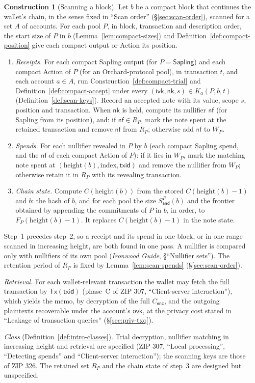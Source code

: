 \documentclass[11pt,a4paper]{article}
\theoremstyle{definition}
\newtheorem{construction}[theorem]{Construction}
\newcommand{\nfsym}{\mathsf{nf}}
\newcommand{\nksym}{\ensuremath{\mathsf{nk}}}
\newcommand{\ivk}{\ensuremath{\mathsf{ivk}}}
\newcommand{\ovk}{\ensuremath{\mathsf{ovk}}}
\begin{document}
\begin{construction}[Scanning a block]\label{def:scan-block}
Let $b$ be a compact block that continues the wallet's chain, in the sense
fixed in ``Scan order'' (\S\ref{sec:scan-order}), scanned for a set $A$ of
accounts. For each pool $P$, in block, transaction and description order,
the start size of $P$ in $b$ (Lemma~\ref{lem:compact-sizes}) and
Definition~\ref{def:compact-position} give each compact output or Action
its position.
\begin{enumerate}
\item \emph{Receipts.} For each compact Sapling output (for
  $P = \mathsf{Sapling}$) and each compact Action of $P$ (for an
  Orchard-protocol pool), in transaction $t$, and each account $a \in A$,
  run Construction~\ref{def:compact-trial} and
  Definition~\ref{def:compact-accept} under every $(\ivk, \nksym, s) \in
  K_a(P, b, t)$ (Definition~\ref{def:scan-keys}). Record an accepted note
  with its value, scope $s$, position and transaction. When $\nksym$ is
  held, compute its nullifier $\nfsym$ (for Sapling from its position), and:
  if $\nfsym \in R_P$, mark the note spent at the retained transaction and
  remove $\nfsym$ from $R_P$; otherwise add $\nfsym$ to $W_P$.
\item \emph{Spends.} For each nullifier revealed in $P$ by $b$ (each compact
  Sapling spend, and the $\nfsym$ of each compact Action of $P$): if it lies
  in $W_P$, mark the matching note spent at $(\mathrm{height}(b),
  \text{index}, \mathsf{txid})$ and remove the nullifier from $W_P$;
  otherwise retain it in $R_P$ with its revealing transaction.
\item \emph{Chain state.} Compute $C(\mathrm{height}(b))$ from the stored
  $C(\mathrm{height}(b) - 1)$ and $b$: the hash of $b$, and for each pool
  the size $S^{P}_{\mathsf{end}}(b)$ and the frontier obtained by appending
  the commitments of $P$ in $b$, in order, to $F_P(\mathrm{height}(b) - 1)$.
  It replaces $C(\mathrm{height}(b) - 1)$ in the note state.
\end{enumerate}
Step~1 precedes step~2, so a receipt and its spend in one block, or in one
range scanned in increasing height, are both found in one pass. A
nullifier is compared only with nullifiers of its own pool (\emph{Ironwood
Guide}, \S``Nullifier sets''). The retention period of $R_P$ is fixed by
Lemma~\ref{lem:scan-spends} (\S\ref{sec:scan-order}).

\emph{Retrieval.} For each wallet-relevant transaction the wallet may
fetch the full transaction by $\mathsf{Tx}(\mathsf{txid})$ (phase~C of ZIP
307, ``Client-server interaction''), which yields the memo, by decryption of
the full $C_{\mathsf{enc}}$, and the outgoing plaintexts recoverable under
the account's $\ovk$, at the privacy cost stated in ``Leakage of transaction
queries'' (\S\ref{sec:priv-txq}).

\emph{Class} (Definition~\ref{def:intro-classes}). Trial decryption,
nullifier matching in increasing height and retrieval are specified (ZIP
307, ``Local processing'', ``Detecting spends'' and ``Client-server
interaction''); the scanning keys are those of ZIP 326. The retained set
$R_P$ and the chain state of step~3 are designed but unspecified.
\end{construction}
\end{document}
